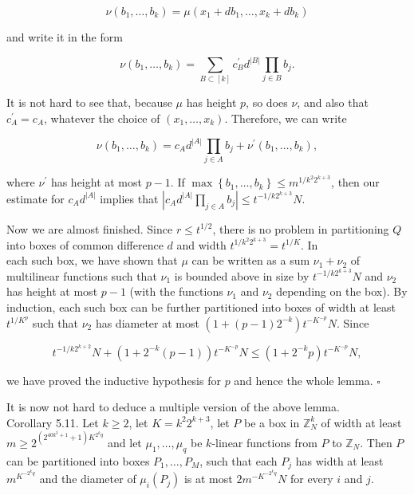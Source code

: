 \documentclass[10pt]{article}
\begin{document}
$$
\nu\left(b_{1}, \ldots, b_{k}\right)=\mu\left(x_{1}+d b_{1}, \ldots, x_{k}+d b_{k}\right)
$$

and write it in the form

$$
\nu\left(b_{1}, \ldots, b_{k}\right)=\sum_{B \subset[k]} c_{B}^{\prime} d^{|B|} \prod_{j \in B} b_{j} .
$$

It is not hard to see that, because $\mu$ has height $p$, so does $\nu$, and also that $c_{A}^{\prime}=c_{A}$, whatever the choice of $\left(x_{1}, \ldots, x_{k}\right)$. Therefore, we can write

$$
\nu\left(b_{1}, \ldots, b_{k}\right)=c_{A} d^{|A|} \prod_{j \in A} b_{j}+\nu^{\prime}\left(b_{1}, \ldots, b_{k}\right),
$$

where $\nu^{\prime}$ has height at most $p-1$. If $\max \left\{b_{1}, \ldots, b_{k}\right\} \leqslant m^{1 / k^{2} 2^{k+3}}$, then our estimate for $c_{A} d^{|A|}$ implies that $\left|c_{A} d^{|A|} \prod_{j \in A} b_{j}\right| \leqslant t^{-1 / k 2^{k+3}} N$.

Now we are almost finished. Since $r \leqslant t^{1 / 2}$, there is no problem in partitioning $Q$ into boxes of common difference $d$ and width $t^{1 / k^{2} 2^{k+3}}=t^{1 / K}$. In\\
each such box, we have shown that $\mu$ can be written as a sum $\nu_{1}+\nu_{2}$ of multilinear functions such that $\nu_{1}$ is bounded above in size by $t^{-1 / k 2^{k+3}} N$ and $\nu_{2}$ has height at most $p-1$ (with the functions $\nu_{1}$ and $\nu_{2}$ depending on the box). By induction, each such box can be further partitioned into boxes of width at least $t^{1 / K^{p}}$ such that $\nu_{2}$ has diameter at most $\left(1+(p-1) 2^{-k}\right) t^{-K^{-p}} N$. Since

$$
t^{-1 / k 2^{k+2}} N+\left(1+2^{-k}(p-1)\right) t^{-K^{-p}} N \leqslant\left(1+2^{-k} p\right) t^{-K^{-p}} N,
$$

we have proved the inductive hypothesis for $p$ and hence the whole lemma. \(\square\)

It is now not hard to deduce a multiple version of the above lemma.\\
Corollary 5.11. Let $k \geqslant 2$, let $K=k^{2} 2^{k+3}$, let $P$ be a box in $\mathbb{Z}_{N}^{k}$ of width at least $m \geqslant 2^{\left(2^{40 k^{3}+1}+1\right)K^{2^{k}q}}$ and let $\mu_{1}, \ldots, \mu_{q}$ be $k$-linear functions from $P$ to $\mathbb{Z}_{N}$. Then $P$ can be partitioned into boxes $P_{1}, \ldots, P_{M}$, such that each $P_{j}$ has width at least $m^{K^{-2^{k}q}}$ and the diameter of $\mu_{i}\left(P_{j}\right)$ is at most $2 m^{-K^{-2^{k}q}} N$ for every $i$ and $j$.
\end{document}
